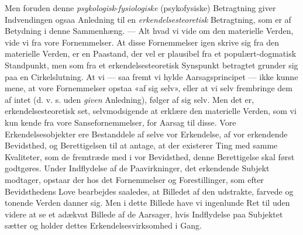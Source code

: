 \documentclass[12pt,a4paper,openany]{book}
\newcommand{\opage}[1]{\marginnote{\footnotesize\textit{[#1]}}}
\begin{document}
Men foruden denne \emph{psykologisk}-\emph{fysiologiske} (psykofysiske)
Betragtning giver Indvendingen ogsaa Anledning til en
\emph{erkendelsesteoretisk} Betragtning, som er af Betydning i denne
Sammenhæng. --- Alt hvad vi vide om den materielle Verden, vide vi fra vore
Fornemmelser. At disse Fornemmelser igen skrive sig fra den materielle Verden,
er en Paastand, der vel er plausibel fra et populært-dogmatisk Standpunkt, men
som fra et erkendelsesteoretisk Synspunkt betragtet grunder sig paa en
Cirkelslutning. At vi --- saa fremt vi hylde Aarsagsprincipet --- ikke kunne
mene, at vore Fornemmelser opstaa «af sig selv», eller at vi selv frembringe
dem af intet (d. v. s. uden \emph{given} Anledning), følger af sig selv. Men
det er, erkendelsesteoretisk set, selvmodsigende at erklære den materielle
Verden, som
\setcounter{footnote}{0}%
\opage{88}vi kun kende fra vore Sansefornemmelser, for Aarsag til disse. Vore
Erkendelsesobjekter ere Bestanddele af selve vor Erkendelse, af vor erkendende
Bevidsthed, og Berettigelsen til at antage, at der existerer Ting med samme
Kvaliteter, som de fremtræde med i vor Bevidsthed, denne Berettigelse skal
først godtgøres. Under Indflydelse af de Paavirkninger, det erkendende Subjekt
modtager, opstaar der hos det Fornemmelser og Forestillinger, som efter
Bevidsthedens Love bearbejdes saaledes, at Billedet af den udstrakte, farvede
og tonende Verden danner sig. Men i dette Billede have vi ingenlunde Ret til
uden videre at se et adækvat Billede af de Aarsager, hvis Indflydelse paa
Subjektet sætter og holder dettes Erkendelsesvirksomhed i Gang.
\end{document}
